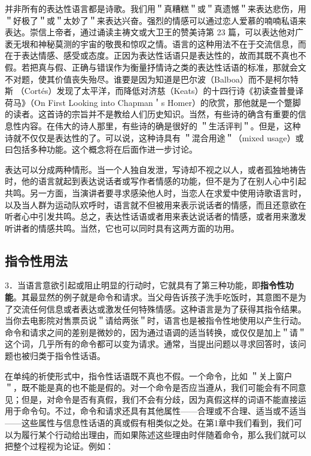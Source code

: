 并非所有的表达性语言都是诗歌。我们用＂真糟糕＂或＂真遗憾＂来表达悲伤，用＂好极了＂或＂太妙了＂来表达兴奋。强烈的情感可以通过恋人爱慕的喃喃私语来表达。崇信上帝者，通过诵读主祷文或大卫王的赞美诗第 23 篇，可以表达他对广袤无垠和神秘莫测的宇宙的敬畏和惊叹之情。语言的这种用法不在于交流信息，而在于表达情感、感受或态度。正因为表达性话语只是表达性的，故而其既不真也不假。若把真与假、正确与错误作为衡量抒情诗之类的表达性话语的标准，那就会文不对题，使其价值丧失殆尽。谁要是因为知道是巴尔波（Balboa）而不是柯尔特斯 （Cortés）发现了太平洋，而降低对济慈（Keats）的十四行诗《初读查普曼译荷马》（On First Looking into Chapman＇s Homer）的欣赏，那他就是一个蹩脚的读者。这首诗的宗旨并不是教给人们历史知识。当然，有些诗的确含有重要的信息性内容。在伟大的诗人那里，有些诗的确是很好的 ＂生活评判＂。但是，这种诗就不仅仅是表达性的了。可以说，这种诗具有 ＂混合用途＂（mixed usage）或曰包括多种功能。这个概念将在后面作进一步讨论。

表达可以分成两种情形。当一个人独自发泄，写诗却不视之以人，或者孤独地祷告时，他的语言就起到表达说话者或写作者情感的功能，但不是为了在别人心中引起共鸣。另一方面，当演讲者要寻求感染他人时，当恋人在求爱中使用诗歌语言时，以及当人群为运动队欢呼时，语言就不但被用来表示说话者的情感，而且还意欲在听者心中引发共鸣。总之，表达性话语或者用来表达说话者的情感，或者用来激发听讲者的情感共鸣。当然，它也可以同时具有这两方面的功用。

\subsection{指令性用法}

3．当语言意欲引起或阻止明显的行动时，它就具有了第三种功能，即\textbf{指令性功能}。其最显然的例子就是命令和请求。当父母告诉孩子洗手吃饭时，其意图不是为了交流任何信息或者表达或激发任何特殊情感。这种语言是为了获得其指令结果。当你去电影院对售票员说＂请给两张＂时，语言也是被指令性地使用以产生行动。命令和请求之间的差别是微妙的，因为通过语调的适当转换，或仅仅是加上＂请＂这个词，几乎所有的命令都可以变为请求。通常，当提出问题以寻求回答时，该问题也被归类于指令性话语。

在单纯的祈使形式中，指令性话语既不真也不假。一个命令，比如 ＂关上窗户＂，既不能是真的也不能是假的。对一个命令是否应当遵从，我们可能会有不同意见；但是，对命令是否有真假，我们不会有分歧，因为真假这样的词语不能直接运用于命令句。不过，命令和请求还具有其他属性——合理或不合理、适当或不适当——这些属性与信息性话语的真或假有相类似之处。在第1章中我们看到，我们可以为履行某个行动给出理由，而如果陈述这些理由时伴随着命令，那么我们就可以把整个过程视为论证。例如：

